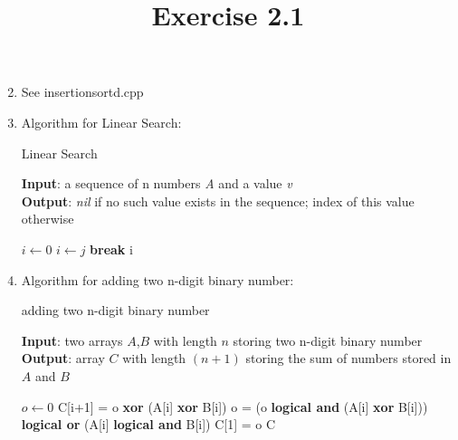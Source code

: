 \documentclass{article}
\title{Exercise 2.1}
\begin{document}
\maketitle

\begin{enumerate}
    \setcounter{enumi}{1}
    \item 
    See insertion\textunderscore sort\textunderscore d.cpp
    \item
    Algorithm for Linear Search:
        \begin{algorithm}
            \caption{Linear Search}\label{euclid}
            \hspace*{\algorithmicindent}\textbf{Input}: a sequence of n numbers \textit{A} and a value \textit{v} \\
            \hspace*{\algorithmicindent}\textbf{Output}: \textit{nil} if no such value exists in the sequence; index of this value otherwise
            \begin{algorithmic}[1]
                    \State $i \gets 0 $
                            \State $i \gets j$
                            \State \textbf{break}
                        \EndIf
                    \EndFor
                    \Return i
            \end{algorithmic}
        \end{algorithm}
    
    \item
    Algorithm for adding two n-digit binary number: 
    \begin{algorithm}
        \caption{adding two n-digit binary number}\label{euclid}
        \hspace*{\algorithmicindent}\textbf{Input}: two arrays $A$,$B$ with length $n$ storing two n-digit binary number\\
        \hspace*{\algorithmicindent}\textbf{Output}: array $C$ with length $(n+1)$ storing the sum of numbers stored in $A$ and $B$
        \begin{algorithmic}[1]
            \State $o \gets 0$
                \State C[i+1] = o \textbf{xor} (A[i] \textbf{xor} B[i])
                \State o = (o \textbf{logical and} (A[i] \textbf{xor} B[i])) \textbf{logical or} (A[i] \textbf{logical and} B[i])
            \EndFor
            \State C[1] = o
            \State \Return C
        \end{algorithmic}
    \end{algorithm}
\end{enumerate}
\end{document}
